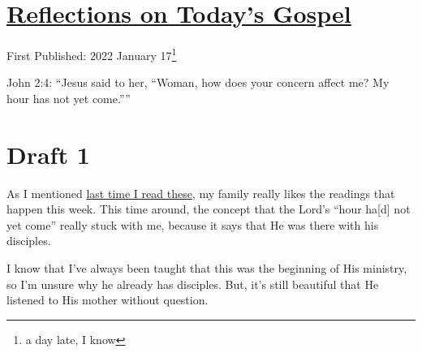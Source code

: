 \documentclass[12pt]{article}[titlepage]
\newcommand{\say}[1]{``#1''}
\newcommand{\1}{\={a}}
\newcommand{\2}{\={e}}
\newcommand{\3}{\={\i}}
\newcommand{\4}{\=o}
\newcommand{\5}{\=u}
\newcommand{\6}{\={A}}
\renewcommand{\,}{\textsuperscript{,}}
\begin{document}
\doublespacing
\section{\href{reflections-on-readings-2-ordinary-c-2022.html}{Reflections on Today's Gospel}}
First Published: 2022 January 17\footnote{a day late, I know}

John 2:4: \say{Jesus said to her, \say{Woman, how does your concern affect me? My hour has not yet come.}}

\section{Draft 1}
As I mentioned \href{reflections-on-readings-2-ordinary-c.html}{last time I read these}, my family really likes the readings that happen this week.
This time around, the concept that the Lord's \say{hour ha[d] not yet come} really stuck with me, because it says that He was there with his disciples.

I know that I've always been taught that this was the beginning of His ministry, so I'm unsure why he already has disciples.
But, it's still beautiful that He listened to His mother without question.
\end{document}

